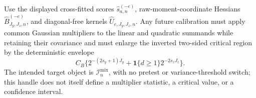 Use the displayed cross-fitted scores \(\widehat s_{a,n}^{(-e)}\), raw-moment-coordinate Hessians \(\widehat B_{J_y,J_z,n}^{(-e)}\), and diagonal-free kernels \(\widehat U_{e,J_y,J_z,n}\). Any future calibration must apply common Gaussian multipliers to the linear and quadratic summands while retaining their covariance and must enlarge the inverted two-sided critical region by the deterministic envelope
\[
C_B\{2^{-(2s_y+1)J_y}+\mathbf 1\{d\ge1\}2^{-2s_zJ_z}\}.
\]
The intended target object is \(\mathcal I_n^{\mathrm{mix}}\), with no pretest or variance-threshold switch; this handle does not itself define a multiplier statistic, a critical value, or a confidence interval.
